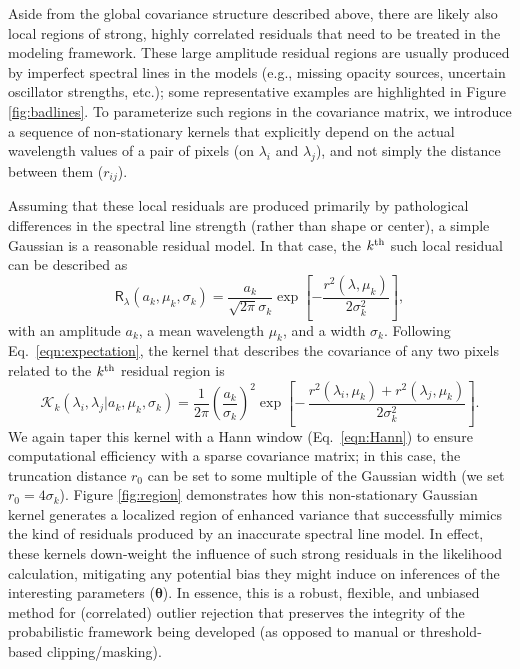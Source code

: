\documentclass[iop,floatfix]{emulateapj}
\newcommand{\vt}{ {\bm \theta}}
\newcommand{\vR}{\mathsf{R}}
\begin{document}
Aside from the global covariance structure described above, there are likely also local regions of 
strong, highly correlated residuals that need to be treated in the modeling framework.  These large 
amplitude residual regions are usually produced by imperfect spectral lines in the models (e.g., 
missing opacity sources, uncertain oscillator strengths, etc.); some representative examples are 
highlighted in Figure \ref{fig:badlines}.  To parameterize such regions in the covariance matrix, 
we introduce a sequence of non-stationary kernels that explicitly depend on the actual wavelength 
values of a pair of pixels (on $\lambda_i$ and $\lambda_j$), and not simply the distance between 
them ($r_{ij}$).  

Assuming that these local residuals are produced primarily by pathological differences in the 
spectral line strength (rather than shape or center), a simple Gaussian is a reasonable residual 
model.  In that case, the $k^{\rm th}$ such local residual can be described as
\begin{equation}
\vR_{\lambda}(a_k, \mu_k, \sigma_k) = \frac{a_k}{\sqrt{2\pi}{\sigma_k}} \exp \left[ - \frac{r^2(\lambda,\mu_k)}{2\sigma_k^2} \right],
\end{equation}
with an amplitude $a_k$, a mean wavelength $\mu_k$, and a width $\sigma_k$.  Following 
Eq.~\ref{eqn:expectation}, the kernel that describes the covariance of any two pixels related to 
the $k^{\rm th}$ residual region is
\begin{equation}
  \mathcal{K}_k(\lambda_i, \lambda_j | a_k, \mu_k, \sigma_k) = \frac{1}{2\pi} \left(\frac{a_k}{\sigma_k}\right)^2 \exp \left [ - \, \frac{r^2(\lambda_i, \mu_k) + r^2(\lambda_j, \mu_k)}{2 \sigma_k^2}\right ].
\label{eqn:klocal}
\end{equation}
We again taper this kernel with a Hann window (Eq.~\ref{eqn:Hann}) to ensure computational 
efficiency with a sparse covariance matrix; in this case, the truncation distance $r_0$ can be set 
to some multiple of the Gaussian width (we set $r_0 = 4\sigma_k$).  
Figure \ref{fig:region} demonstrates how this non-stationary Gaussian 
kernel generates a localized region of enhanced variance that successfully mimics the kind of 
residuals produced by an inaccurate spectral line model.  In effect, these kernels down-weight the 
influence of such strong residuals in the likelihood calculation, mitigating any potential bias 
they might induce on inferences of the interesting parameters ($\vt$).  In essence, this is a 
robust, flexible, and unbiased method for (correlated) outlier rejection that preserves the 
integrity of the probabilistic framework being developed (as opposed to manual or threshold-based 
clipping/masking).  
\end{document}
